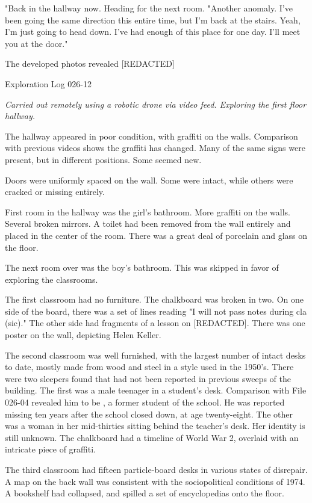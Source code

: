 "Back in the hallway now. Heading for the next room.
\newpage
"Another anomaly. I've been going the same direction this entire time, but I'm back at the stairs. Yeah, I'm just going to head down. I've had enough of this place for one day. I'll meet you at the door."

The developed photos revealed [REDACTED]
\bigskip
\begin{flushleft}
Exploration Log 026-12
\end{flushleft}
\textsl{Carried out remotely using a robotic drone via video feed. Exploring the first floor hallway.}

The hallway appeared in poor condition, with graffiti on the walls. Comparison with previous videos shows the graffiti has changed. Many of the same signs were present, but in different positions. Some seemed new.

Doors were uniformly spaced on the wall. Some were intact, while others were cracked or missing entirely.

First room in the hallway was the girl's bathroom. More graffiti on the walls. Several broken mirrors. A toilet had been removed from the wall entirely and placed in the center of the room. There was a great deal of porcelain and glass on the floor.

The next room over was the boy's bathroom. This was skipped in favor of exploring the classrooms.

The first classroom had no furniture. The chalkboard was broken in two. On one side of the board, there was a set of lines reading "I will not pass notes during cla (sic)." The other side had fragments of a lesson on [REDACTED]. There was one poster on the wall, depicting Helen Keller.

The second classroom was well furnished, with the largest number of intact desks to date, mostly made from wood and steel in a style used in the 1950's. There were two sleepers found that had not been reported in previous sweeps of the building. The first was a male teenager in a student's desk. Comparison with File 026-04 revealed him to be  , a former student of the school. He was reported missing ten years after the school closed down, at age twenty-eight. The other was a woman in her mid-thirties sitting behind the teacher's desk. Her identity is still unknown. The chalkboard had a timeline of World War 2, overlaid with an intricate piece of graffiti.

The third classroom had fifteen particle-board desks in various states of disrepair. A map on the back wall was consistent with the sociopolitical conditions of 1974. A bookshelf had collapsed, and spilled a set of encyclopedias onto the floor.

